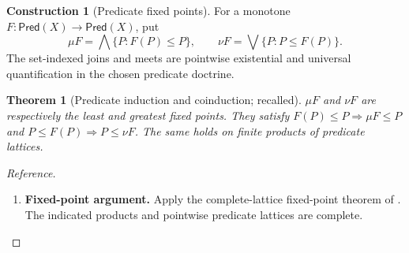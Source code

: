 \documentclass[11pt,a4paper]{article}
\numberwithin{equation}{section}
\newtheorem{theorem}{Theorem}[section]
\theoremstyle{definition}
\newtheorem{construction}[construction]{Construction}
\theoremstyle{remark}
\theoremstyle{plain}
\begin{document}
\begin{construction}[Predicate fixed points]
\label{con:egt-fixedpoint}
For a monotone $F:\mathsf{Pred}(X)\to\mathsf{Pred}(X)$, put
\[
 \mu F=\bigwedge\{P:F(P)\leq P\},\qquad
 \nu F=\bigvee\{P:P\leq F(P)\}.
\]
The set-indexed joins and meets are pointwise existential and universal
quantification in the chosen predicate doctrine.
\end{construction}

\begin{theorem}[Predicate induction and coinduction; recalled]
\label{prop:egt-fixedpoint}
$\mu F$ and $\nu F$ are respectively the least and greatest fixed points.
They satisfy $F(P)\leq P\Rightarrow\mu F\leq P$ and
$P\leq F(P)\Rightarrow P\leq\nu F$.
The same holds on finite products of predicate lattices.
\end{theorem}
\begin{proof}[Reference]
\leavevmode
\begin{enumerate}[label=\textup{(\arabic*)},leftmargin=*,itemsep=4pt,topsep=3pt]
  \item \textbf{Fixed-point argument.} Apply the complete-lattice fixed-point theorem of \citet{Tarski1955}. The indicated products and pointwise predicate lattices are complete.
\end{enumerate}
\end{proof}
\end{document}
